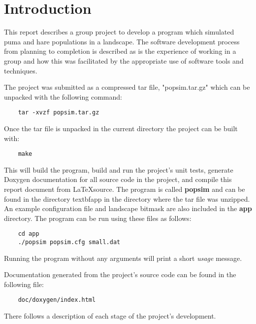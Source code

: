 \section{Introduction}
\label{Introduction}
This report describes a group project to develop a program which simulated puma and hare populations in a landscape.  
The software development process from planning to completion is described as is the experience of working in a group and how this was facilitated by the appropriate use of software tools and techniques.

The project was submitted as a compressed tar file, "popsim.tar.gz" which can be unpacked with the following command:

\begin{lstlisting}
	tar -xvzf popsim.tar.gz
\end{lstlisting}

Once the tar file is unpacked in the current directory the project can be built with:

\begin{lstlisting}
	make
\end{lstlisting}

This will build the program, build and run the project's unit tests, generate Doxygen documentation for all source code in the project, and compile this report document from \LaTeX source.  The program is called \textbf{popsim} and can be found in the directory textbf{app} in the directory where the tar file was unzipped.  An example configuration file and landscape bitmask are also included in the \textbf{app} directory.  The program can be run using these files as follows:
   

\begin{lstlisting}
	cd app
	./popsim popsim.cfg small.dat
\end{lstlisting}

Running the program without any arguments will print a short \textit{usage} message.

Documentation generated from the project's source code can be found in the following file:

\begin{lstlisting}
	doc/doxygen/index.html
\end{lstlisting}

There follows a description of each stage of the project's development.
